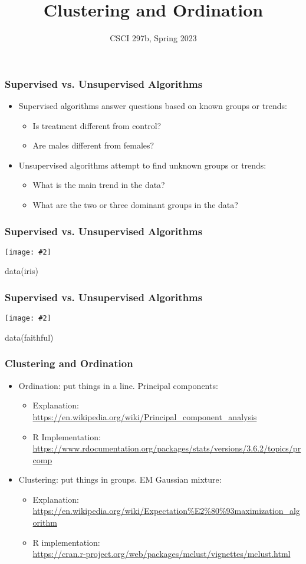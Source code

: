 \documentclass{beamer}
\title{Clustering and Ordination}
\author{CSCI 297b, Spring 2023}
\newcommand{\bi}{\begin{itemize}}
\newcommand{\li}{\item}
\newcommand{\ei}{\end{itemize}}
\newcommand{\fig}[2]{\centerline{\texttt{[image: \#2]}}}
\newcommand{\bfr}[1]{\begin{frame}[fragile]\frametitle{{ #1 }}}
\begin{document}
\begin{frame}
\maketitle
\end{frame}

\bfr{Supervised vs. Unsupervised Algorithms}
\bi
\li Supervised algorithms answer questions based on known groups or trends:
\bi
\li Is treatment different from control?
\li Are males different from females?
\ei
\li Unsupervised algorithms attempt to find unknown groups or trends:
\bi
\li What is the main trend in the data?
\li What are the two or three dominant groups in the data?
\ei
\ei
\end{frame}

\bfr{Supervised vs. Unsupervised Algorithms}
\fig{.8}{irisdata}
\centerline{data(iris)}
\end{frame}
\bfr{Supervised vs. Unsupervised Algorithms}
	\fig{.8}{faithfuldata}
	\centerline{data(faithful)}
\end{frame}

\bfr{Clustering and Ordination}
\bi
\li Ordination:  put things in a line.  Principal components:
\bi
\li Explanation:\\
 \url{https://en.wikipedia.org/wiki/Principal_component_analysis}
\li R Implementation:\\
\url{https://www.rdocumentation.org/packages/stats/versions/3.6.2/topics/prcomp}
\ei
\li Clustering: put things in groups. EM Gaussian mixture:
\bi
\li Explanation:\\
\url{https://en.wikipedia.org/wiki/Expectation%E2%80%93maximization_algorithm}
\li R implementation:\\
\url{https://cran.r-project.org/web/packages/mclust/vignettes/mclust.html}
\ei
\ei
\end{frame}
\end{document}
